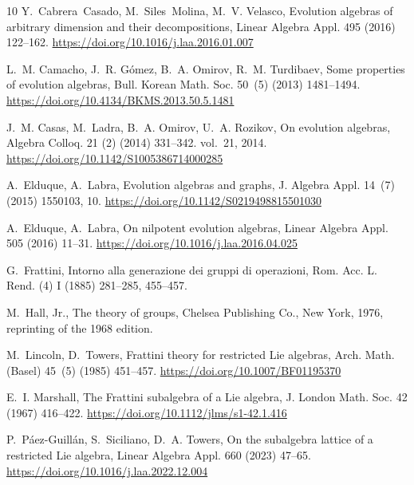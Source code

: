 \documentclass[12pt,reqno]{amsart}
\theoremstyle{definition}
\theoremstyle{remark}
\numberwithin{equation}{section}
\begin{document}
\begin{thebibliography}{10}
Y.~Cabrera~Casado, M.~Siles~Molina, M.~V. Velasco, Evolution algebras of
  arbitrary dimension and their decompositions, Linear Algebra Appl. 495 (2016)
  122--162.
\newline\urlprefix\url{https://doi.org/10.1016/j.laa.2016.01.007}

L.~M. Camacho, J.~R. G\'omez, B.~A. Omirov, R.~M. Turdibaev, Some properties of
  evolution algebras, Bull. Korean Math. Soc. 50~(5) (2013) 1481--1494.
\newline\urlprefix\url{https://doi.org/10.4134/BKMS.2013.50.5.1481}

J.~M. Casas, M.~Ladra, B.~A. Omirov, U.~A. Rozikov, On evolution algebras, Algebra Colloq. 21 (2) (2014) 331--342.
  vol.~21, 2014.
\newline\urlprefix\url{https://doi.org/10.1142/S1005386714000285}

A.~Elduque, A.~Labra, Evolution algebras and graphs, J. Algebra Appl. 14~(7)
  (2015) 1550103, 10.
\newline\urlprefix\url{https://doi.org/10.1142/S0219498815501030}

A.~Elduque, A.~Labra, On nilpotent evolution algebras, Linear Algebra Appl. 505
  (2016) 11--31.
\newline\urlprefix\url{https://doi.org/10.1016/j.laa.2016.04.025}

G.~Frattini, Intorno alla generazione dei gruppi di operazioni, Rom. Acc. L.
  Rend. (4) I (1885) 281--285, 455--457.

M.~Hall, Jr., The theory of groups, Chelsea Publishing Co., New York, 1976,
  reprinting of the 1968 edition.

M.~Lincoln, D.~Towers, Frattini theory for restricted {L}ie algebras, Arch.
  Math. (Basel) 45~(5) (1985) 451--457.
\newline\urlprefix\url{https://doi.org/10.1007/BF01195370}

E.~I. Marshall, The {F}rattini subalgebra of a {L}ie algebra, J. London Math.
  Soc. 42 (1967) 416--422.
\newline\urlprefix\url{https://doi.org/10.1112/jlms/s1-42.1.416}

P.~P\'aez-Guill\'an, S.~Siciliano, D.~A. Towers, On the subalgebra lattice of a
  restricted {L}ie algebra, Linear Algebra Appl. 660 (2023) 47--65.
\newline\urlprefix\url{https://doi.org/10.1016/j.laa.2022.12.004}


\end{thebibliography}
\end{document}
